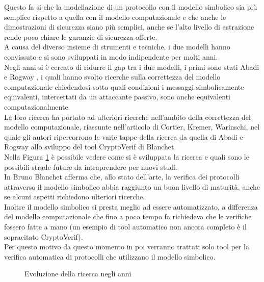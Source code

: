 Questo fa si che la modellazione di un protocollo con il modello simbolico sia più semplice rispetto a quella con il modello computazionale e che anche le dimostrazioni di sicurezza siano più semplici, anche se l'alto livello di astrazione rende poco chiare le garanzie di sicurezza offerte.\\
A causa del diverso insieme di strumenti e tecniche, i due modelli hanno convissuto e si sono sviluppati in modo indipendente per molti anni.\\
Negli anni si è cercato di ridurre il gap tra i due modelli, i primi sono stati Abadi e Rogway \cite{AR00}, i quali hanno svolto ricerche sulla correttezza del modello computazionale chiedendosi sotto quali condizioni i messaggi simbolicamente equivalenti, intercettati da un attaccante passivo, sono anche equivalenti computazionalmente.\\
La loro ricerca ha portato ad ulteriori ricerche nell'ambito della correttezza del modello computazionale, riassunte nell'articolo di Cortier, Kremer, Warinschi\cite{CSW11}, nel quale gli autori ripercorrono le varie tappe della ricerca da quella di Abadi e Rogway allo sviluppo del tool CryptoVerif di Blanchet.\\
Nella Figura \ref{fig:st} è possibile vedere come si è sviluppata la ricerca e quali sono le possibili strade future da intraprendere per nuovi studi.\\
In \cite{BB12} Bruno Blanchet afferma che, allo stato dell'arte, la verifica dei protocolli attraverso il modello simbolico abbia raggiunto un buon livello di maturità, anche se alcuni aspetti richiedono ulteriori ricerche.\\
Inoltre il modello simbolico si presta meglio ad essere automatizzato, a differenza del modello computazionale che fino a poco tempo fa richiedeva che le verifiche fossero fatte a mano (un esempio di tool automatico non ancora completo è il sopracitato CryptoVerif).\\ 
Per questo motivo da questo momento in poi verranno trattati solo tool per la verifica automatica di protocolli che utilizzano il modello simbolico.\\

\begin{figure}[h!] 
    \centering 
    \caption{Evoluzione della ricerca negli anni}
    \label{fig:st} 
\end{figure}
\newpage
